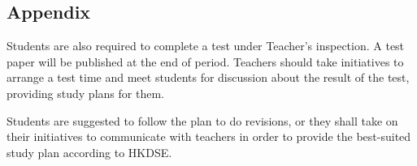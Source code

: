 \documentclass{article}
\begin{document}
    \subsection*{Appendix}

    Students are also required to complete a test under Teacher's inspection. A test paper will be published at the end of period. Teachers should take initiatives to arrange a test time and meet students for discussion about the result of the test, providing study plans for them.

    Students are suggested to follow the plan to do revisions, or they shall take on their initiatives to communicate with teachers in order to provide the best-suited study plan according to HKDSE.
\end{document}
